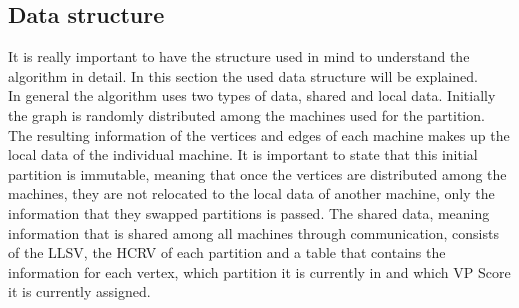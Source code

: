 \documentclass[acmsmall,nonacm,screen,review]{acmart}
\begin{document}
\subsection{Data structure}
It is really important to have the structure used in mind to understand the algorithm in detail. In this section the used data structure will be explained.\\
In general the algorithm uses two types of data, shared and local data. Initially the graph is randomly distributed among the machines used for the partition. The resulting information of the vertices and edges of each machine makes up the local data of the individual machine. It is important to state that this initial partition is immutable, meaning that once the vertices are distributed among the machines, they are not relocated to the local data of another machine, only the information that they swapped partitions is passed. The shared data, meaning information that is shared among all machines through communication, consists of the LLSV, the HCRV of each partition and a table that contains the information for each vertex, which partition it is currently in and which VP Score it is currently assigned.
\end{document}
